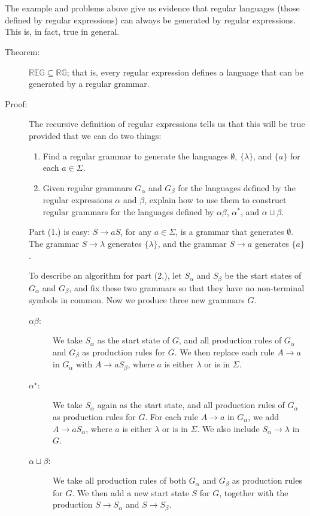 \documentclass{article}
\begin{document}
\subsection*{\ }


The example and problems above give us evidence that regular languages (those defined by regular expressions) can always be generated by regular expressions. This is, in fact, true in general.

\begin{description}
\item[Theorem:] $\mathbb{REG} \subseteq \mathbb{RG}$; that is, every regular expression defines a language that can be generated by a regular grammar.

\item[Proof:] The recursive definition of regular expressions tells us that this will be true provided that we can do two things:
  \begin{enumerate}
    \item Find a regular grammar to generate the languages $\emptyset$, $\{\lambda\}$, and $\{a\}$ for each $a \in \Sigma$.
    \item Given regular grammars $G_\alpha$ and $G_\beta$ for the languages defined by the regular expressions $\alpha$ and $\beta$, explain how to use them to construct regular grammars for the languages defined by $\alpha \beta$, $\alpha^*$, and $\alpha \sqcup \beta$.
  \end{enumerate}

  Part (1.) is easy: $S \to aS$, for any $a\in \Sigma$, is a grammar that generates $\emptyset$. The grammar $S \to \lambda$ generates $\{\lambda\}$, and the grammar $S \to a$ generates $\{a\}$.

  To describe an algorithm for part (2.), let $S_\alpha$ and $S_\beta$ be the start states of $G_\alpha$ and $G_\beta$, and fix these two grammars so that they have no non-terminal symbols in common. Now we produce three new grammars $G$.
  \begin{description}
    \item[$\alpha\beta$: ] We take $S_\alpha$ as the start state of $G$, and all production rules of $G_\alpha$ and $G_\beta$ as production rules for $G$. We then replace each rule $A \to a$ in $G_\alpha$ with $A \to aS_\beta$, where $a$ is either $\lambda$ or is in $\Sigma$.
    \item[$\alpha^\star$: ] We take $S_\alpha$ again as the start state, and all production rules of $G_\alpha$ as production rules for $G$. For each rule $A \to a$ in $G_\alpha$, we add $A \to aS_\alpha$, where $a$ is either $\lambda$ or is in $\Sigma$. We also include $S_\alpha \to \lambda$ in $G$.
    \item[$\alpha \sqcup \beta$: ] We take all production rules of both $G_\alpha$ and $G_\beta$ as production rules for $G$. We then add a new start state $S$ for $G$, together with the production $S \to S_\alpha$ and $S \to S_\beta$.
  \end{description}


\end{description}
\end{document}
